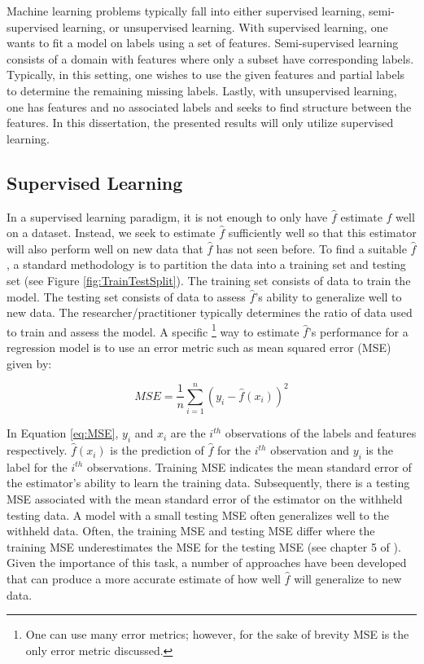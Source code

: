 Machine learning problems typically fall into either supervised learning, semi-supervised learning, or unsupervised learning. With supervised learning, one wants to fit a model on labels using a set of features. Semi-supervised learning consists of a domain with features where only a subset have corresponding labels. Typically, in this setting, one wishes to use the given features and partial labels to determine the remaining missing labels. Lastly, with unsupervised learning, one has features and no associated labels and seeks to find structure between the features.  In this dissertation, the presented results will only utilize supervised learning. 

\subsection{Supervised Learning} \label{sec:SupervisedLearning}
In a supervised learning paradigm, it is not enough to only have \(\hat{f}\) estimate \(f\) well on a dataset. Instead, we seek to estimate \(\hat{f}\) sufficiently well so that this estimator will also perform well on new data that  \(\hat{f}\) has not seen before. To find a suitable \(\hat{f}\), a standard methodology is to partition the data into a training set and testing set (see Figure \ref{fig:TrainTestSplit}). The training set consists of data to train the model. The testing set consists of data to assess \(\hat{f}\)'s ability to generalize well to new data. The researcher/practitioner typically determines the ratio of data used to train and assess the model.  A specific  \footnote{One can use many error metrics; however, for the sake of brevity MSE is the only error metric discussed.}  way to estimate  \(\hat{f}\)'s performance for a regression model is to use an error metric such as mean squared error (MSE) given by:  

\begin{equation}
\label{eq:MSE}
MSE = \frac{1}{n} \sum_{i=1}^n (y_i -\hat{f}(x_i))^2
\end{equation}

\noindent In Equation  \ref{eq:MSE}, \(y_i\) and \(x_i\) are the \(i^{th}\) observations of the labels and features respectively. \(\hat{f}(x_i)\) is the prediction of \(\hat{f}\) for the \(i^{th}\) observation and \(y_i\) is the label for the \(i^{th}\) observations. Training MSE indicates the mean standard error of the estimator's ability to learn the training data.  Subsequently, there is a testing MSE associated with the mean standard error of the estimator on the withheld testing data. A model with a small testing MSE often generalizes well to the withheld data. Often, the training MSE and testing MSE differ where the training MSE underestimates the MSE for the testing MSE (see chapter 5 of \cite{ISL}). Given the importance of this task, a number of approaches have been developed that can produce a more accurate estimate of how well \(\hat{f}\) will generalize to new data.


